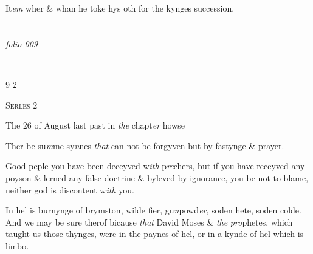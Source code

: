\documentclass[12pt, a4paper]{book}
\begin{document}
		\ifthenelse{\isodd{\thepage}}
		{\reversemarginpar}
		{\normalmarginpar}
		It\textit{em} wher \& whan he toke hys oth for the kynges
 succession.

\dotfill
						\newpage {} \section*{}

\textit{folio 009}



 \begin{flushright}{\color{Mahogany}9} 2\end{flushright}
 

               
				\begin{center} \begin{large} {\scshape Serles 2} \end{large} \end{center}
			
 
		\ifthenelse{\isodd{\thepage}}
		{\reversemarginpar}
		{\normalmarginpar}
		The 26 of August last past in \textit{the} chapt\textit{er} howse
 
				\marginpar[\vspace{0.5cm}{\textcolor{Gray}{n}}]{}
			
		\ifthenelse{\isodd{\thepage}}
		{\reversemarginpar}
		{\normalmarginpar}
		Ther be su\textit{m}me sy\textit{n}nes \textit{that} can not be forgyven but by
 fastynge \& prayer.
 
				\marginpar[\vspace{0.5cm}{\textcolor{Gray}{n}}]{}
			
		\ifthenelse{\isodd{\thepage}}
		{\reversemarginpar}
		{\normalmarginpar}
		Good peple you have been deceyved w\textit{ith} p\textit{re}chers, but
 if you have receyved any poyson \& lerned any false
 doctrine \& byleved by ignorance, you be not to blame,
 neither god is discontent w\textit{ith} you.
 
				\marginpar[\vspace{0.5cm}{\textcolor{Gray}{n}}]{}
			
		\ifthenelse{\isodd{\thepage}}
		{\reversemarginpar}
		{\normalmarginpar}
		In hel is burnynge of brymston, wilde fier, gu\textit{n}powd\textit{er},
 soden hete, soden colde. And we may be sure therof
 bicause \textit{that} David Moses \& \textit{the}
               \textit{pro}phetes, which taught
 us those thynges, were in the paynes of hel, or in
 a kynde of hel which is limbo.
	
\end{document}
